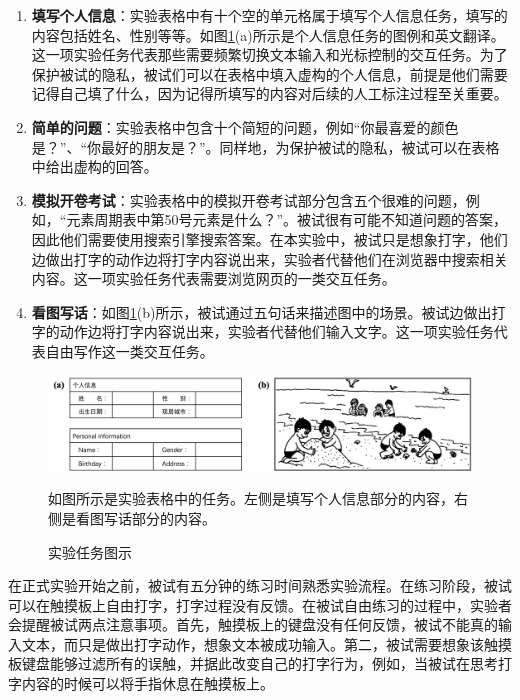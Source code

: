 \begin{enumerate}
	\item \textbf{填写个人信息}：实验表格中有十个空的单元格属于填写个人信息任务，填写的内容包括姓名、性别等等。如图\ref{fig:TypeBoard_study1_task}(a)所示是个人信息任务的图例和英文翻译。这一项实验任务代表那些需要频繁切换文本输入和光标控制的交互任务。为了保护被试的隐私，被试们可以在表格中填入虚构的个人信息，前提是他们需要记得自己填了什么，因为记得所填写的内容对后续的人工标注过程至关重要。
	\item \textbf{简单的问题}：实验表格中包含十个简短的问题，例如“你最喜爱的颜色是？”、“你最好的朋友是？”。同样地，为保护被试的隐私，被试可以在表格中给出虚构的回答。
	\item \textbf{模拟开卷考试}：实验表格中的模拟开卷考试部分包含五个很难的问题，例如，“元素周期表中第50号元素是什么？”。被试很有可能不知道问题的答案，因此他们需要使用搜索引擎搜索答案。在本实验中，被试只是想象打字，他们边做出打字的动作边将打字内容说出来，实验者代替他们在浏览器中搜索相关内容。这一项实验任务代表需要浏览网页的一类交互任务。
	\item \textbf{看图写话}：如图\ref{fig:TypeBoard_study1_task}(b)所示，被试通过五句话来描述图中的场景。被试边做出打字的动作边将打字内容说出来，实验者代替他们输入文字。这一项实验任务代表自由写作这一类交互任务。
\end{enumerate}

\begin{figure}[!tbh]
	\includegraphics[width=1.0\linewidth]{figures/TypeBoard_study1_task.png}
	\centering
	\caption*{如图所示是实验表格中的任务。左侧是填写个人信息部分的内容，右侧是看图写话部分的内容。}
	\caption{实验任务图示}
	\label{fig:TypeBoard_study1_task}
\end{figure}

在正式实验开始之前，被试有五分钟的练习时间熟悉实验流程。在练习阶段，被试可以在触摸板上自由打字，打字过程没有反馈。在被试自由练习的过程中，实验者会提醒被试两点注意事项。首先，触摸板上的键盘没有任何反馈，被试不能真的输入文本，而只是做出打字动作，想象文本被成功输入。第二，被试需要想象该触摸板键盘能够过滤所有的误触，并据此改变自己的打字行为，例如，当被试在思考打字内容的时候可以将手指休息在触摸板上。

